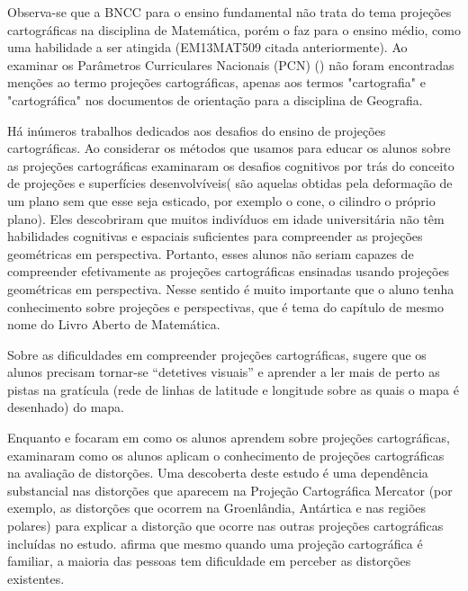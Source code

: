 \begin{apresentacao}
{Observa-se que a BNCC para o ensino fundamental não trata do tema projeções cartográficas na disciplina de Matemática, porém o faz para o ensino médio, como uma habilidade a ser atingida (EM13MAT509 citada anteriormente).  Ao examinar os Parâmetros Curriculares Nacionais (PCN) (\cite{PCN}) não foram encontradas menções ao termo projeções cartográficas, apenas aos termos "cartografia" e "cartográfica" nos documentos de orientação para a disciplina de Geografia. 

Há inúmeros trabalhos dedicados aos desafios do ensino de projeções cartográficas. Ao considerar os métodos que usamos para educar os alunos sobre as projeções cartográficas \cite{Downs}  examinaram os desafios cognitivos por trás do conceito de projeções e superfícies desenvolvíveis( são aquelas obtidas pela deformação de um plano sem que esse seja esticado, por exemplo o cone, o cilindro o próprio plano). Eles descobriram que muitos indivíduos em idade universitária não têm habilidades cognitivas e espaciais suficientes para compreender as projeções geométricas em perspectiva. Portanto, esses alunos não seriam capazes de compreender efetivamente as projeções cartográficas ensinadas usando projeções geométricas em perspectiva. Nesse sentido é muito importante que o aluno tenha conhecimento sobre projeções e perspectivas, que é tema do capítulo de mesmo nome do Livro Aberto de Matemática.

 Sobre as dificuldades em compreender projeções cartográficas, \cite{Olson} sugere que os alunos  precisam  tornar-se “detetives visuais” e aprender a ler mais de perto as pistas na gratícula (rede de linhas de latitude e longitude sobre as quais o mapa é desenhado) do mapa.

Enquanto \cite{Downs} e \cite{Olson} focaram em como os alunos aprendem sobre projeções cartográficas, \cite{Battersby} examinaram como os alunos aplicam o conhecimento de projeções cartográficas na avaliação de distorções. Uma descoberta deste estudo é uma dependência substancial nas distorções que aparecem na Projeção Cartográfica Mercator (por exemplo, as distorções que ocorrem na Groenlândia, Antártica e nas regiões polares) para explicar a distorção que ocorre nas outras projeções cartográficas incluídas no estudo. \cite{Battersby} afirma que mesmo quando uma projeção cartográfica é familiar, a maioria das pessoas tem dificuldade em perceber as distorções existentes.

}
\end{apresentacao}
